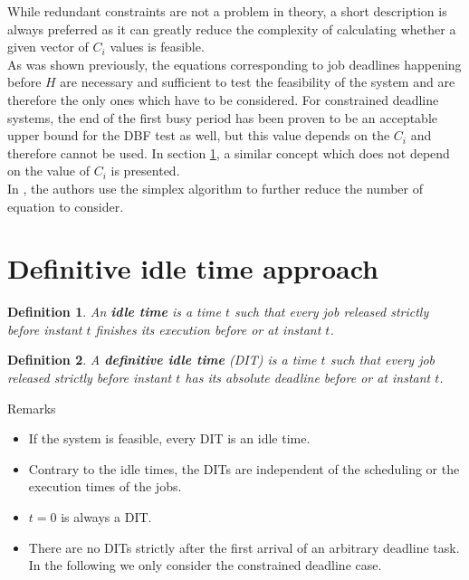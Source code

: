\documentclass[a4paper,10pt]{article}
\newtheorem{definition}{Definition}
\begin{document}
While redundant constraints are not a problem in theory, a short description is
always preferred as it can greatly reduce the complexity of calculating
whether a given vector of $C_i$ values is feasible.\\

As was shown previously, the equations corresponding to job deadlines happening
before $H$ are necessary and sufficient to test the feasibility of the system
and are therefore the only ones which have to be considered. For
constrained deadline systems, the end of the first busy period has been proven
to be an acceptable upper bound for the DBF test as well, but this value depends
on the $C_i$ and therefore cannot be used. In section \ref{sct:DIT}, a similar
concept which does not depend on the value of $C_i$ is presented.\\

In \cite{lipariaverage}, the authors use the simplex algorithm to further reduce the number of equation to consider.

\section{Definitive idle time approach}
\label{sct:DIT}

\begin{definition}
An \textbf{idle time} is a time $t$ such that every job released strictly before instant $t$ finishes its execution before  or at instant $t$.\\
\end{definition}

\begin{definition}
A \textbf{definitive idle time} (DIT) is a time $t$ such that every job released strictly before instant $t$ has its absolute deadline before or at instant $t$.\\
\end{definition}

Remarks
 \begin{itemize}
  \item If the system is feasible, every DIT is an idle time.
  \item Contrary to the idle times, the DITs are independent of the scheduling or the execution times of the jobs.
  \item $t=0$ is always a DIT.
  \item There are no DITs strictly after the first arrival of an arbitrary deadline task. In the following we only consider the constrained deadline case.
 \end{itemize}
\end{document}

